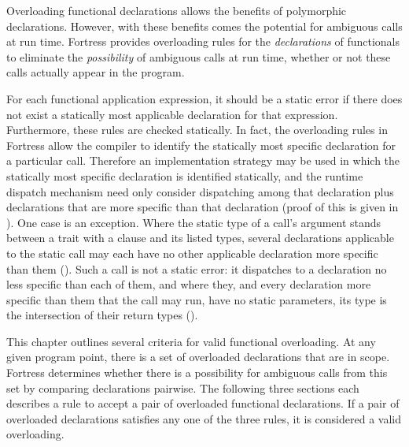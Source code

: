 Overloading functional declarations allows the benefits of polymorphic
declarations.  However, with these benefits comes the potential for
ambiguous calls at run time.  Fortress provides overloading rules for the
\emph{declarations} of functionals to eliminate the \emph{possibility}
of ambiguous calls at run time, whether or not these calls actually
appear in the program.

For each functional application expression, it should be a static error
if there does not exist a statically most applicable declaration for
that expression.
Furthermore, these rules are checked statically.
In fact, the overloading rules
in Fortress allow the compiler to identify the
statically most specific declaration for a particular call.  Therefore
an implementation strategy may be used in which the statically most
specific declaration is identified statically, and the runtime
dispatch mechanism need only consider dispatching among that
declaration plus declarations that are more specific than that
declaration (proof of this is given in ).
One case is an exception.
Where the static type of a call's argument stands between a trait with a
 clause and its listed types, several declarations applicable to
the static call may each have no other applicable declaration more specific
than them ().
Such a call is not a static error: it dispatches to a declaration no less
specific than each of them, and where they, and every declaration more specific
than them that the call may run, have no static parameters, its type is the
intersection of their return types ().

This chapter outlines several criteria for valid functional
overloading.  At any given program point, there is a set of overloaded
declarations that are in scope.  Fortress determines whether there is
a possibility for ambiguous calls from this set by comparing
declarations pairwise.  The following three sections each describes a
rule to accept a pair of overloaded functional declarations.  If a
pair of overloaded declarations satisfies any one of the three rules,
it is considered a valid overloading.

